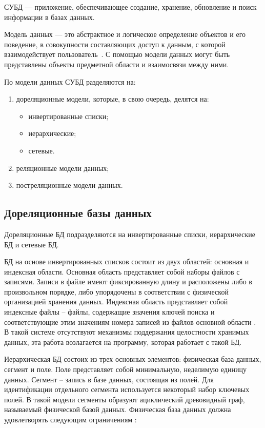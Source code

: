 СУБД --- приложение, обеспечивающее создание, хранение, обновление и поиск информации в базах данных.

Модель данных --- это абстрактное и логическое определение объектов и его поведение, в совокупности составляющих доступ к данным, с которой взаимодействует пользователь~\cite{info_intro_db_williams}. С помощью модели данных могут быть представлены объекты предметной области и взаимосвязи между ними.

По модели данных СУБД разделяются на:

\begin{enumerate}
	\item дореляционные модели, которые, в свою очередь, делятся на:
	\begin{itemize}
		\item инвертированные списки;
		\item иерархические;
		\item сетевые.
	\end{itemize}
	\item реляционные модели данных;
	\item постреляционные модели данных.
\end{enumerate}

\subsection{Дореляционные базы данных}

Дореляционные БД подразделяются на инвертированные списки, иерархические БД и сетевые БД.

БД на основе инвертированных списков состоит из двух областей: основная и индексная области. Основная область представляет собой наборы файлов с записями. Записи в файле имеют фиксированную длину и расположены либо в произвольном порядке, либо упорядочены в соответствии с физической организацией хранения данных. Индексная область представляет собой индексные файлы -- файлы, содержащие значения ключей поиска и соответствующие этим значениям номера записей из файлов основной области \cite{info_inverted_lists}. В такой системе отсутствуют механизмы поддержания целостности хранимых данных, эта работа возлагается на программу, которая работает с такой БД.

Иерархическая БД состоих из трех основных элементов: физическая база данных, сегмент и поле. Поле представляет собой минимальную, неделимую единицу данных. Сегмент -- запись в базе данных, состоящая из полей. Для идентификации отдельного сегмента используется некоторый набор ключевых полей. В такой модели сегменты образуют ациклический древовидный граф, называемый физической базой данных. Физическая база данных должна удовлетворять следующим ограничениям \cite{info_inverted_lists}: 

